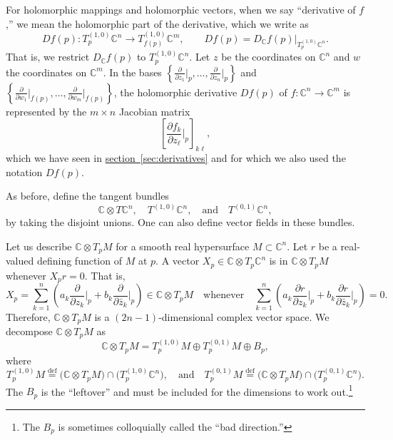 \documentclass[12pt,openany]{book}
\newcommand{\C}{{\mathbb{C}}}
\theoremstyle{plain}
\theoremstyle{remark}
\theoremstyle{definition}
\theoremstyle{exercise}
\theoremstyle{example}
\newcommand{\sectionref}[1]{\hyperref[#1]{section~\ref*{#1}}}
\begin{document}
For holomorphic mappings and holomorphic vectors,
when we say ``derivative of $f$,'' we mean the holomorphic part of the
derivative, which we write as
%
\begin{equation*}
D f(p) \colon T_p^{(1,0)} \C^n \to T_{f(p)}^{(1,0)} \C^m ,
\qquad
D f(p) = D_{\C} f(p) \big|_{T_p^{(1,0)} \C^n} .
\end{equation*}
That is, we restrict $D_\C f(p)$ to $T_p^{(1,0)} \C^n$.
Let $z$ be the coordinates on $\C^n$ and
$w$ the coordinates on $\C^m$.
In the bases
$\left\{ \frac{\partial}{\partial z_1} \big|_p,\ldots,
\frac{\partial}{\partial z_n} \big|_p \right\}$
and
$\left\{ \frac{\partial}{\partial w_1} \big|_{f(p)},\ldots,
\frac{\partial}{\partial w_m} \big|_{f(p)} \right\}$,
the holomorphic derivative $Df(p)$ of $f \colon \C^{n} \to \C^m$
is represented by the $m \times n$ Jacobian matrix
\begin{equation*}
\left[
\frac{\partial f_k}{\partial z_\ell} \Big|_p
\right]_{k\ell} ,
\end{equation*}
which we have seen in \sectionref{sec:derivatives}
and for which we also used the notation $Df(p)$.

As before, define the tangent bundles
\begin{equation*}
\C \otimes T\C^n,
\quad
T^{(1,0)} \C^n,
\quad \text{and} \quad
T^{(0,1)} \C^n ,
\end{equation*}
by taking the disjoint unions.
One can also define vector fields in these bundles.

Let us describe $\C \otimes T_pM$
for a smooth real hypersurface $M \subset \C^n$.
Let $r$ be a real-valued defining function of
$M$ at $p$.  A vector
$X_p \in \C \otimes T_p\C^n$ is in
$\C \otimes T_pM$ whenever $X_p r = 0$.  That is,
\begin{equation*}
X_p = \sum_{k=1}^n
\left(
a_k
\frac{\partial}{\partial z_k} \Big|_p
+
b_k
\frac{\partial}{\partial \bar{z}_k} \Big|_p
\right) \in \C \otimes T_p M
\quad
\text{whenever}
\quad
 \sum_{k=1}^n
\left(
a_k
\frac{\partial r}{\partial z_k} \Big|_p
+
b_k
\frac{\partial r}{\partial \bar{z}_k} \Big|_p
\right)
= 0 .
\end{equation*}
Therefore, $\C \otimes T_p M$ is a $(2n-1)$-dimensional complex vector space.
We decompose $\C \otimes T_p M$ as
\begin{equation*}
\C \otimes T_pM =
T_p^{(1,0)} M \oplus T_p^{(0,1)} M \oplus B_p ,
\end{equation*}
where
\begin{equation*}
T_p^{(1,0)} M \overset{\text{def}}{=} \bigl( \C \otimes T_pM \bigr) \cap
\bigl( T_p^{(1,0)} \C^n \bigr),  \quad \text{and}
\quad
T_p^{(0,1)} M \overset{\text{def}}{=} \bigl( \C \otimes T_pM \bigr) \cap
\bigl( T_p^{(0,1)} \C^n \bigr) .
\end{equation*}
The $B_p$ is the ``leftover'' and must
be included for the dimensions to work out.\footnote{%
The $B_p$ is sometimes colloquially called the ``bad direction.''}
\end{document}
